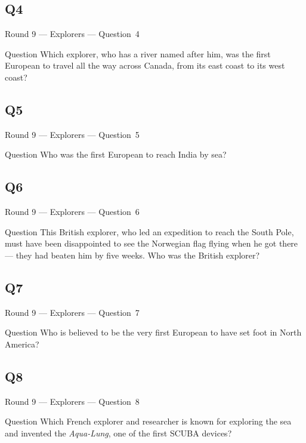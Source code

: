 \documentclass[11pt]{beamer}
\begin{document}
\subsection*{Q4}
\begin{frame}[t]{Round 9 --- Explorers --- \mbox{Question 4}}
\begin{block}{Question}
Which explorer, who has a river named after him, was the first European to travel all the way across Canada, from its east coast to its west coast?
\end{block}
\end{frame}
\subsection*{Q5}
\begin{frame}[t]{Round 9 --- Explorers --- \mbox{Question 5}}
\begin{block}{Question}
Who was the first European to reach India by sea?
\end{block}
\end{frame}
\subsection*{Q6}
\begin{frame}[t]{Round 9 --- Explorers --- \mbox{Question 6}}
\begin{block}{Question}
This British explorer, who led an expedition to reach the South Pole, must have been disappointed to see the Norwegian flag flying when he got there --- they had beaten him by five weeks. Who was the British explorer?
\end{block}
\end{frame}
\subsection*{Q7}
\begin{frame}[t]{Round 9 --- Explorers --- \mbox{Question 7}}
\begin{block}{Question}
Who is believed to be the very first European to have set foot in North America?
\end{block}
\end{frame}
\subsection*{Q8}
\begin{frame}[t]{Round 9 --- Explorers --- \mbox{Question 8}}
\begin{block}{Question}
Which French explorer and researcher is known for exploring the sea and invented the \emph{Aqua-Lung}, one of the first SCUBA devices?
\end{block}
\end{frame}
\end{document}

